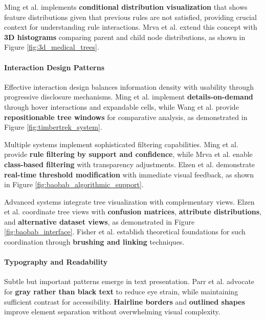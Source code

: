 Ming et al. \cite{ming2019rulematrix} implements \textbf{conditional distribution visualization} that shows feature distributions given that previous rules are not satisfied, providing crucial context for understanding rule interactions. Mrva et al. \cite{mrva2019decision} extend this concept with \textbf{3D histograms} comparing parent and child node distributions, as shown in Figure \ref{fig:3d_medical_trees}.

\paragraph{Interaction Design Patterns}

Effective interaction design balances information density with usability through progressive disclosure mechanisms. Ming et al. \cite{ming2019rulematrix} implement \textbf{details-on-demand} through hover interactions and expandable cells, while Wang et al. \cite{wang2022timbertrek} provide \textbf{repositionable tree windows} for comparative analysis, as demonstrated in Figure \ref{fig:timbertrek_system}.

Multiple systems implement sophisticated filtering capabilities. Ming et al. \cite{ming2019rulematrix} provide \textbf{rule filtering by support and confidence}, while Mrva et al. \cite{mrva2019decision} enable \textbf{class-based filtering} with transparency adjustments. Elzen et al. \cite{elzen2011baobabview} demonstrate \textbf{real-time threshold modification} with immediate visual feedback, as shown in Figure \ref{fig:baobab_algorithmic_support}.

Advanced systems integrate tree visualization with complementary views. Elzen et al. \cite{elzen2011baobabview, 10.5555/383784} coordinate tree views with \textbf{confusion matrices}, \textbf{attribute distributions}, and \textbf{alternative dataset views}, as demonstrated in Figure \ref{fig:baobab_interface}. Fisher et al. \cite{fisher2012making} establish theoretical foundations for such coordination through \textbf{brushing and linking} techniques.

\paragraph{Typography and Readability}

Subtle but important patterns emerge in text presentation. Parr et al. \cite{parr2019dtreeviz} advocate for \textbf{gray rather than black text} to reduce eye strain, while maintaining sufficient contrast for accessibility. \textbf{Hairline borders} and \textbf{outlined shapes} improve element separation without overwhelming visual complexity.

